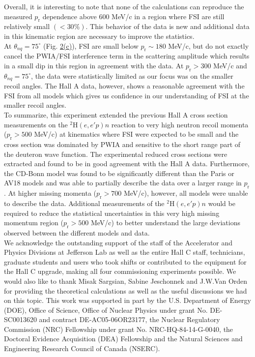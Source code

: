 \indent Overall, it is interesting to note that none of the calculations can reproduce the measured $p_{\mathrm{r}}$ dependence above 600 MeV/c in a region where FSI are still relatively small $(<30\%)$.  This behavior of the data is new
and additional data in this kinematic region are necessary to improve the statistics. \\
\indent At $\theta_{nq}=75^{\circ}$ (Fig. \hyperref[fig:fig2]{2(c)}), FSI are small below $p_{\mathrm{r}}\sim180$ MeV/c, but do not exactly cancel the PWIA/FSI interference term in the scattering amplitude which results in a small dip in this region in agreement with the data.
At $p_{\mathrm{r}}>300$ MeV/c and $\theta_{nq}=75^{\circ}$, the data were statistically limited as our focus was on the smaller recoil angles. The Hall A data, however, shows a reasonable agreement with the FSI from all models which gives us confidence in our understanding
of FSI at the smaller recoil angles. \\
\indent To summarize, this experiment extended the previous Hall A cross section measurements on the $^{2}\mathrm{H}(e,e'p)n$ reaction to 
very high neutron recoil momenta ($p_{\mathrm{r}}>500$ MeV/c) at kinematics where FSI were expected to be small and the cross section was dominated by PWIA and sensitive to the
short range part of the deuteron wave function. The experimental reduced cross sections were extracted and found to be in good agreement with the Hall A data.
Furthermore, the CD-Bonn model was found to be significantly different than the Paris or AV18 models and was able to partially describe the data over a larger range in $p_{\mathrm{r}}$.
At higher missing momenta ($p_{\mathrm{r}}>700$ MeV/c), however, all models were unable to describe the data. 
Additional measurements of the $^{2}\mathrm{H}(e,e'p)n$ would be required to reduce the statistical uncertainties in this very high missing
momentum region ($p_{\mathrm{r}}>500$ MeV/c) to better understand the large deviations observed between the different models and data.\\
\indent We acknowledge the outstanding support of the staff of the Accelerator and Physics Divisions at Jefferson Lab
as well as the entire Hall C staff, technicians, graduate students and users who took shifts or contributed
to the equipment for the Hall C upgrade, making all four commissioning experiments possible. We would also like to
thank Misak Sargsian, Sabine Jeschonnek and J.W.Van Orden for providing the theoretical calculations as well as the useful
discussions we had on this topic. This work was supported in part by the U.S. Department of Energy (DOE), Office of Science, Office of Nuclear Physics
under grant No. DE-SC0013620 and contract DE-AC05-06OR23177, the Nuclear Regulatory Commission (NRC) Fellowship
under grant No. NRC-HQ-84-14-G-0040, the Doctoral Evidence Acquisition (DEA) Fellowship and the Natural Sciences and Engineering Research Council of Canada (NSERC).

